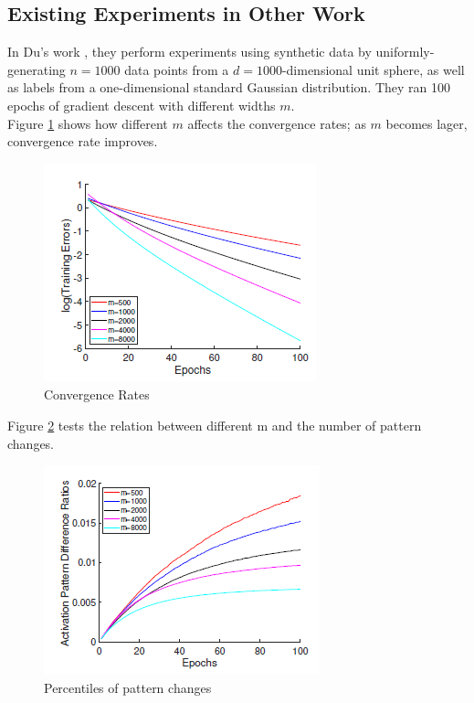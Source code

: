\documentclass{article}
\begin{document}
\subsection{Existing Experiments in Other Work}

In Du's work \cite{SimonDu}, they perform experiments using synthetic data by uniformly-generating $n = 1000$ data points from a $d = 1000$-dimensional unit sphere, as well as labels from a one-dimensional standard Gaussian distribution. 
They ran 100 epochs of gradient descent with different widths $m$. \\

Figure \ref{fig:conver} shows how different $m$ affects the convergence rates; as $m$ becomes lager, convergence rate improves.

\begin{figure}[htb]
	\centering
    \includegraphics[scale= 0.5]{pics/overparameterization/ConvergeRate.PNG}
    \caption{Convergence Rates}
	\label{fig:conver}
\end{figure}

Figure \ref{fig:patternsample} tests the relation between different m and the number of pattern changes.

\begin{figure}[htb]
	\centering
    \includegraphics[scale= 0.5]{pics/overparameterization/PatternSample.PNG}
    \caption{Percentiles of pattern changes}
	\label{fig:patternsample}
\end{figure}
\end{document}
